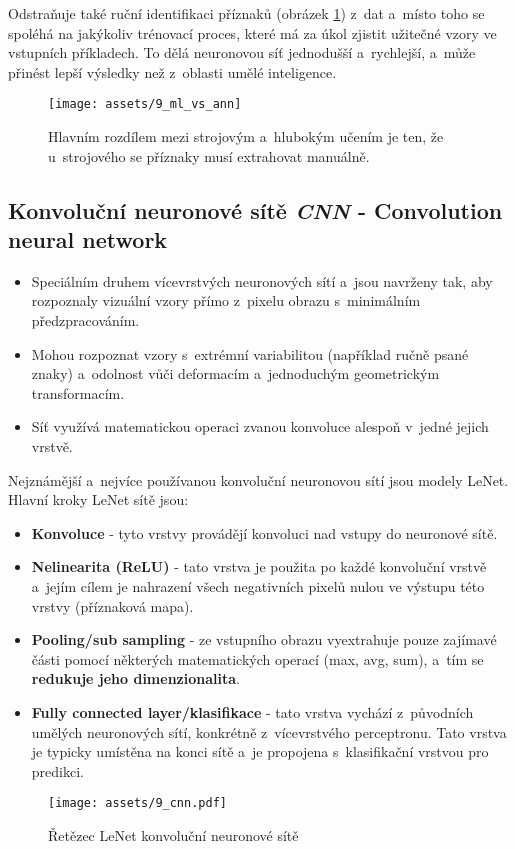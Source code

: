 Odstraňuje také ruční identifikaci příznaků (obrázek \ref{fig:ml_vs_ann}) z~dat a~místo toho se spoléhá na jakýkoliv trénovací proces, které má za úkol zjistit užitečné vzory ve vstupních příkladech. To dělá neuronovou síť jednodušší a~rychlejší, a~může přinést lepší výsledky než z~oblasti umělé inteligence.

\begin{figure}[H]
    \centering
    \texttt{[image: assets/9\_ml\_vs\_ann]}
    \caption{Hlavním rozdílem mezi strojovým a~hlubokým učením je ten, že u~strojového se příznaky musí extrahovat manuálně.}
    \label{fig:ml_vs_ann}
\end{figure}

\subsection{Konvoluční neuronové sítě \textit{CNN} - Convolution neural network}
\begin{itemize}
    \item Speciálním druhem vícevrstvých neuronových sítí a~jsou navrženy tak, aby rozpoznaly vizuální vzory přímo z~pixelu obrazu s~minimálním předzpracováním.
    \item Mohou rozpoznat vzory s~extrémní variabilitou (například ručně psané znaky) a~odolnost vůči deformacím a~jednoduchým geometrickým transformacím.
    \item Síť využívá matematickou operaci zvanou konvoluce alespoň v~jedné jejich vrstvě.
\end{itemize}

Nejznámější a~nejvíce používanou konvoluční neuronovou sítí jsou modely LeNet.
Hlavní kroky LeNet sítě jsou:
\begin{itemize}
    \item{\textbf{Konvoluce} - tyto vrstvy provádějí konvoluci nad vstupy do neuronové sítě.}
    \item{\textbf{Nelinearita (ReLU)} - tato vrstva je použita po každé konvoluční vrstvě a~jejím cílem je nahrazení všech negativních pixelů nulou ve výstupu této vrstvy (příznaková mapa).}
    \item{\textbf{Pooling/sub sampling} - ze vstupního obrazu vyextrahuje pouze zajímavé části pomocí některých matematických operací (max, avg, sum), a~tím se \textbf{redukuje jeho dimenzionalita}.}
    \item{\textbf{Fully connected layer/klasifikace} - tato vrstva vychází z~původních umělých neuronových sítí, konkrétně z~vícevrstvého perceptronu. Tato vrstva je typicky umístěna na konci sítě a~je propojena s~klasifikační vrstvou pro predikci.}
\end{itemize}
\begin{figure}[H]
    \centering
    \texttt{[image: assets/9\_cnn.pdf]}
    \caption{Řetězec LeNet konvoluční neuronové sítě}
    \label{fig:cnn}
\end{figure}

